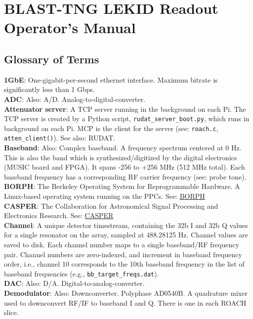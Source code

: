 \chapter{BLAST-TNG LEKID Readout Operator's Manual}\label{mcp}

\section{Glossary of Terms}

\noindent
\textbf{1GbE}: One-gigabit-per-second ethernet interface. Maximum bitrate is significantly less than 1 Gbps.\\
\textbf{ADC}: Also: A/D. Analog-to-digital-converter.\\
\textbf{Attenuator server}: A TCP server running in the background on each Pi. The TCP server is created by a Python script, \texttt{rudat\_server\_boot.py}, which runs in background on each Pi. MCP is the client for the server (see: \texttt{roach.c}, \texttt{atten\_client()}). See also: RUDAT.\\
\textbf{Baseband}: Also: Complex baseband. A frequency spectrum centered at 0 Hz. This is also the band which is synthesized/digitized by the digital electronics (MUSIC board and FPGA). It spans -256 to +256 MHz (512 MHz total). Each baseband frequency has a corresponding RF carrier frequency (see: probe tone).\\
\textbf{BORPH}: The Berkeley Operating System for Reprogrammable Hardware. A Linux-based operating system running on the PPCs. See: \href{https://casper.ssl.berkeley.edu/wiki/BORPH}{BORPH}\\
\textbf{CASPER}: The Collaboration for Astronomical Signal Processing and Electronics Research. See: \href{https://casper.berkeley.edu}{CASPER}\\
\textbf{Channel}: A unique detector timestream, containing the 32b I and 32b Q values for a single resonator on the array, sampled at 488.28125 Hz. Channel values are saved to disk. Each channel number maps to a single baseband/RF frequency pair. Channel numbers are zero-indexed, and increment in baseband frequency order, i.e., channel 10 corresponds to the 10th baseband frequency in the list of baseband frequencies (e.g., \texttt{bb\_target\_freqs.dat}).\\
\textbf{DAC}: Also: D/A. Digital-to-analog-converter.\\
\textbf{Demodulator}: Also: Downconverter. Polyphase AD0540B. A quadrature mixer used to downconvert RF/IF to baseband I and Q. There is one in each ROACH slice.\\
